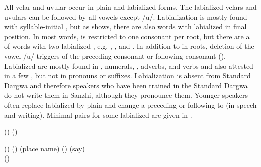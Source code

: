 All velar and uvular  occur in plain and labialized forms. The labialized velars and uvulars can be followed by all vowels except /u/. Labialization is mostly found with syllable-initial , but as  shows, there are also words with labialized  in final position. In most words,  is restricted to one consonant per root, but there are a  of words with two labialized , e.g.  ,  , and  . In addition to  in roots, deletion of the vowel /u/ triggers  of the preceding consonant or following consonant (). Labialized  are mostly found in , numerals, , adverbs, and verbs and also attested in a few , but not in pronouns or suffixes. Labialization is absent from Standard Dargwa and therefore speakers who have been trained in the Standard Dargwa  do not write them in Sanzhi, although they pronounce them. Younger speakers often replace labialized  by plain  and change a preceding or following  to  (in speech and writing). Minimal pairs for some labialized  are given in .
%
\begin{exe}
	\ex	\label{ex:labialization phon@A}
	\begin{xlist}
		\TabPositions{14em}
		\ex	{} () 	\tab {} () \label{ex:delqij phon}
		
		\ex	{} () 	\tab {} () 	\label{ex:bixwij phon}
		\ex	{}  (place name)	\tab {}  () \label{ex:akri phon}
		\ex	{} 	\tab {} 	(say) \label{ex:ikwij phon}\\
		() 
	\end{xlist}
\end{exe}


